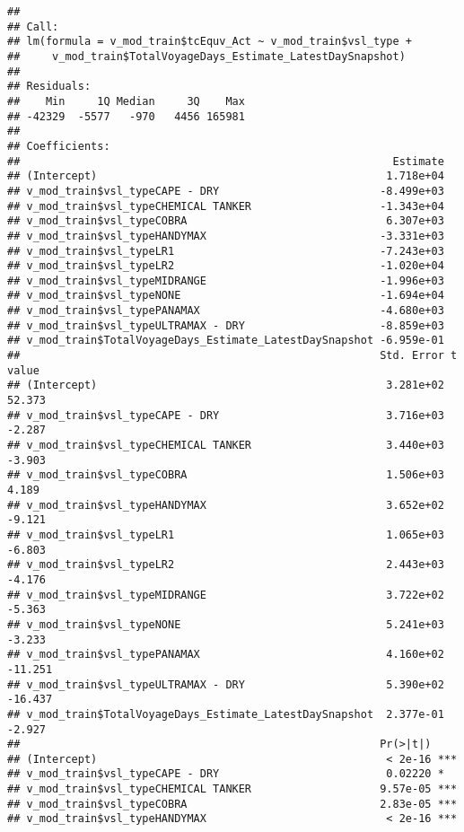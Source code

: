 \documentclass[]{article}
\begin{document}
\begin{verbatim}
## 
## Call:
## lm(formula = v_mod_train$tcEquv_Act ~ v_mod_train$vsl_type + 
##     v_mod_train$TotalVoyageDays_Estimate_LatestDaySnapshot)
## 
## Residuals:
##    Min     1Q Median     3Q    Max 
## -42329  -5577   -970   4456 165981 
## 
## Coefficients:
##                                                          Estimate
## (Intercept)                                             1.718e+04
## v_mod_train$vsl_typeCAPE - DRY                         -8.499e+03
## v_mod_train$vsl_typeCHEMICAL TANKER                    -1.343e+04
## v_mod_train$vsl_typeCOBRA                               6.307e+03
## v_mod_train$vsl_typeHANDYMAX                           -3.331e+03
## v_mod_train$vsl_typeLR1                                -7.243e+03
## v_mod_train$vsl_typeLR2                                -1.020e+04
## v_mod_train$vsl_typeMIDRANGE                           -1.996e+03
## v_mod_train$vsl_typeNONE                               -1.694e+04
## v_mod_train$vsl_typePANAMAX                            -4.680e+03
## v_mod_train$vsl_typeULTRAMAX - DRY                     -8.859e+03
## v_mod_train$TotalVoyageDays_Estimate_LatestDaySnapshot -6.959e-01
##                                                        Std. Error t value
## (Intercept)                                             3.281e+02  52.373
## v_mod_train$vsl_typeCAPE - DRY                          3.716e+03  -2.287
## v_mod_train$vsl_typeCHEMICAL TANKER                     3.440e+03  -3.903
## v_mod_train$vsl_typeCOBRA                               1.506e+03   4.189
## v_mod_train$vsl_typeHANDYMAX                            3.652e+02  -9.121
## v_mod_train$vsl_typeLR1                                 1.065e+03  -6.803
## v_mod_train$vsl_typeLR2                                 2.443e+03  -4.176
## v_mod_train$vsl_typeMIDRANGE                            3.722e+02  -5.363
## v_mod_train$vsl_typeNONE                                5.241e+03  -3.233
## v_mod_train$vsl_typePANAMAX                             4.160e+02 -11.251
## v_mod_train$vsl_typeULTRAMAX - DRY                      5.390e+02 -16.437
## v_mod_train$TotalVoyageDays_Estimate_LatestDaySnapshot  2.377e-01  -2.927
##                                                        Pr(>|t|)    
## (Intercept)                                             < 2e-16 ***
## v_mod_train$vsl_typeCAPE - DRY                          0.02220 *  
## v_mod_train$vsl_typeCHEMICAL TANKER                    9.57e-05 ***
## v_mod_train$vsl_typeCOBRA                              2.83e-05 ***
## v_mod_train$vsl_typeHANDYMAX                            < 2e-16 ***

\end{verbatim}
\end{document}
